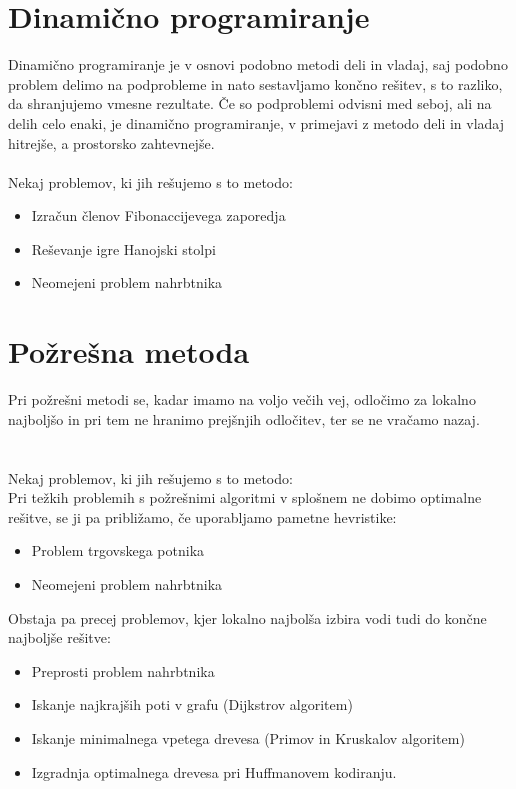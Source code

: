\documentclass[10pt,a4paper,oneside]{book}
\newenvironment{items}{
\begin{itemize}
  \setlength{\itemsep}{1pt}
  \setlength{\parskip}{0pt}
  \setlength{\parsep}{0pt}
}{\end{itemize}}
\begin{document}
\section{Dinamično programiranje}
Dinamično programiranje je v osnovi podobno metodi deli in vladaj, saj podobno problem delimo na podprobleme in nato sestavljamo končno rešitev, s to razliko, da shranjujemo vmesne rezultate. Če so podproblemi odvisni med seboj, ali na delih celo enaki, je dinamično programiranje, v primejavi z metodo deli in vladaj hitrejše, a prostorsko zahtevnejše.\\
%
 \\
Nekaj problemov, ki jih rešujemo s to metodo:
\begin{items}
	\item Izračun členov Fibonaccijevega zaporedja
	\item Reševanje igre Hanojski stolpi
	\item Neomejeni problem nahrbtnika
\end{items}

\section{Požrešna metoda}
Pri požrešni metodi se, kadar imamo na voljo večih vej, odločimo za lokalno najboljšo in pri tem ne hranimo prejšnjih odločitev, ter se ne vračamo nazaj.\\
 \\
 \\
Nekaj problemov, ki jih rešujemo s to metodo:\\
Pri težkih problemih s požrešnimi algoritmi v splošnem ne dobimo optimalne rešitve, se ji pa približamo, če uporabljamo pametne hevristike:
\begin{items}
	\item Problem trgovskega potnika
	\item Neomejeni problem nahrbtnika
\end{items}
Obstaja pa precej problemov, kjer lokalno najbolša izbira vodi tudi do končne najboljše rešitve:
\begin{items}
	\item Preprosti problem nahrbtnika
	\item Iskanje najkrajših poti v grafu (Dijkstrov algoritem)
	\item Iskanje minimalnega vpetega drevesa (Primov in Kruskalov algoritem)
	\item Izgradnja optimalnega drevesa pri Huffmanovem kodiranju.
\end{items}
\end{document}
